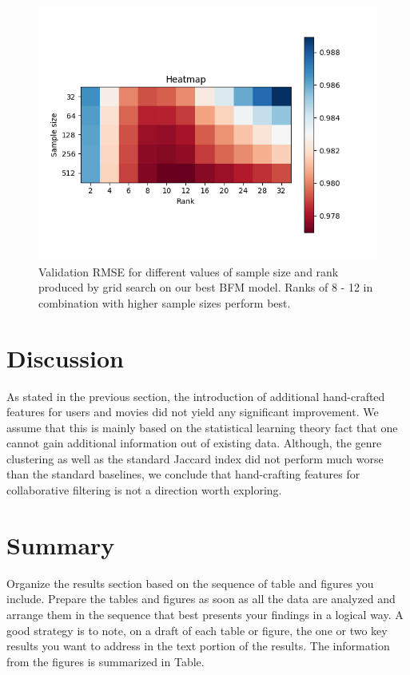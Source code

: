 \documentclass[10pt,conference,compsocconf]{IEEEtran}
\begin{document}
    \begin{figure}
        \includegraphics[width=\columnwidth]{figures/heatmap.png}
        \caption{Validation RMSE for different values of sample size and rank produced by grid search on our best BFM model.
        Ranks of 8 - 12 in combination with higher sample sizes perform best.}
        \label{fig:Heatmap}
    \end{figure}


    \section{Discussion}
    As stated in the previous section, the introduction of additional hand-crafted features for users and movies did not yield any significant improvement.
    We assume that this is mainly based on the statistical learning theory fact that one cannot gain additional information out of existing data.
    Although, the genre clustering as well as the standard Jaccard index did not perform much worse than the standard baselines, we conclude that hand-crafting features for collaborative filtering is not a direction worth exploring.




    \section{Summary}

    Organize the results section based on the sequence of table and
    figures you include. Prepare the tables and figures as soon as all
    the data are analyzed and arrange them in the sequence that best
    presents your findings in a logical way. A good strategy is to note,
    on a draft of each table or figure, the one or two key results you
    want to address in the text portion of the results.
    The information from the figures is
    summarized in Table.




    \balance
    
    
\end{document}
